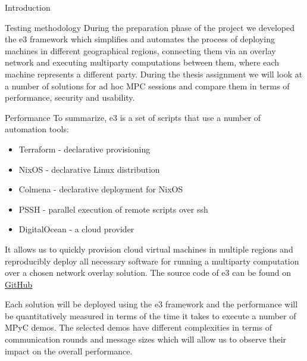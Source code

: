 \begin{frame}
\tableofcontents

\printnoidxglossary[type=\acronymtype,title=List of Abbreviations]
\listoffigures

\mainmatter
\end{frame}

\begin{frame}{Introduction}
\protect\hypertarget{introduction}{}
\end{frame}

\begin{frame}{Testing methodology}
\protect\hypertarget{testing-methodology}{}
During the preparation phase of the project we developed the \gls{e3}
framework which simplifies and automates the process of deploying
machines in different geographical regions, connecting them via an
overlay network and executing multiparty computations between them,
where each machine represents a different party. During the thesis
assignment we will look at a number of solutions for ad hoc MPC sessions
and compare them in terms of performance, security and usability.

\begin{block}{Performance}
\protect\hypertarget{performance}{}
To summarize, \gls{e3} is a set of scripts that use a number of
automation tools:

\begin{itemize}
\tightlist
\item
  Terraform - declarative provisioning
\item
  NixOS - declarative Linux distribution
\item
  Colmena - declarative deployment for NixOS
\item
  PSSH - parallel execution of remote scripts over ssh
\item
  DigitalOcean - a cloud provider
\end{itemize}

It allows us to quickly provision cloud virtual machines in multiple
regions and reproducibly deploy all necessary software for running a
multiparty computation over a chosen network overlay solution. The
source code of \gls{e3} can be found on
\href{https://github.com/e-nikolov/mpyc}{GitHub}

Each solution will be deployed using the \gls{e3} framework and the
performance will be quantitatively measured in terms of the time it
takes to execute a number of MPyC demos. The selected demos have
different complexities in terms of communication rounds and message
sizes which will allow us to observe their impact on the overall
performance.


\end{block}
\end{frame}
